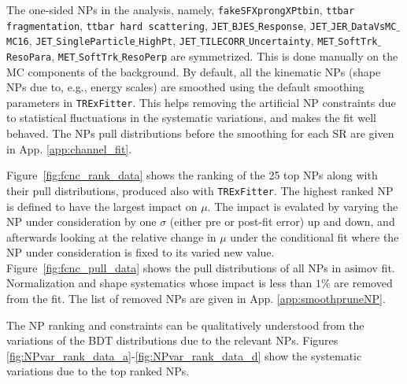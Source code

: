 The one-sided NPs in the analysis, namely, \texttt{fakeSFXprongXPtbin}, \texttt{ttbar fragmentation}, \texttt{ttbar hard scattering}, \texttt{JET$\_$BJES$\_$Response}, \texttt{JET$\_$JER$\_$DataVsMC$\_$MC16}, \texttt{JET$\_$SingleParticle$\_$HighPt}, \texttt{JET$\_$TILECORR$\_$Uncertainty}, \texttt{MET$\_$SoftTrk$\_$ResoPara}, \texttt{MET$\_$SoftTrk$\_$ResoPerp} are symmetrized. This is done manually on the MC components of the background. By default, all the kinematic NPs (shape NPs due to, e.g., energy scales) are smoothed using the default smoothing parameters in \texttt{TRExFitter}. This helps removing the artificial NP constraints due to statistical fluctuations in the systematic variations, and makes the fit well behaved. The NPs pull distributions before the smoothing for each SR are given in App. \ref{app:channel_fit}.

Figure~\ref{fig:fcnc_rank_data} shows the ranking of the 25 top NPs along with their pull distributions, produced also with {\tt TRExFitter}. The highest ranked NP is defined to have the largest impact on $\mu$. The impact is evalated by varying the NP under consideration by one $\sigma$ (either pre or post-fit error) up and down, and afterwards looking at the relative change in $\mu$ under the conditional fit where the NP under consideration is fixed to its varied new value.
Figure~\ref{fig:fcnc_pull_data} shows the pull distributions of all NPs in asimov fit. %
Normalization and shape systematics whose impact is less than $1\%$ are removed from the fit. The list of removed NPs are given in App. \ref{app:smoothpruneNP}.

The NP ranking and constraints can be qualitatively understood from the variations of the BDT distributions due to the relevant NPs. Figures \ref{fig:NPvar_rank_data_a}-\ref{fig:NPvar_rank_data_d} show the systematic variations due to the top ranked NPs. %

